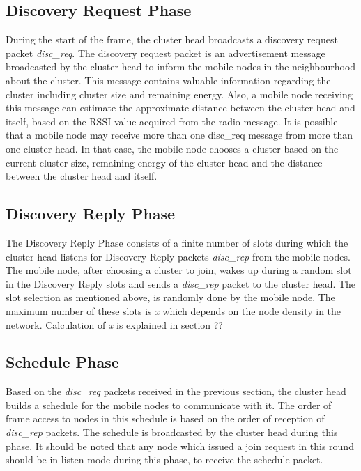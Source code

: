 \documentclass[a4paper, conference, 10pt]{IEEEtran}
\begin{document}
\subsection{Discovery Request Phase}
\label{disc_req_phase}
During the start of the frame, the cluster head broadcasts a discovery request packet \emph{disc\_req}. The discovery request packet is an advertisement message broadcasted by the cluster head to inform the mobile nodes in the neighbourhood about the cluster. This message contains valuable information regarding the cluster including cluster size and remaining energy. Also, a mobile node receiving this message can estimate the approximate distance between the cluster head and itself, based on the RSSI value acquired from the radio message. It is possible that a mobile node may receive more than one disc\_req message from more than one cluster head. In that case, the mobile node chooses a cluster based on the current cluster size, remaining energy of the cluster head and the distance between the cluster head and itself. 

\subsection{Discovery Reply Phase}
\label{disc_rep_phase}
The Discovery Reply Phase consists of a finite number of slots during which the cluster head listens for Discovery Reply packets \emph{disc\_rep} from the mobile nodes. The mobile node, after choosing a cluster to join, wakes up during a random slot in the Discovery Reply slots and sends a \emph{disc\_rep} packet to the cluster head. The slot selection as mentioned above, is randomly done by the mobile node. The maximum number of these slots is \emph{x} which depends on the node density in the network. Calculation of \emph{x} is explained in section ??

\subsection{Schedule Phase}
\label{sched_phase}
Based on the \emph{disc\_req} packets received in the previous section, the cluster head builds a schedule for the mobile nodes to communicate with it. The order of frame access to nodes in this schedule is based on the order of reception of \emph{disc\_rep} packets. The schedule is broadcasted by the cluster head during this phase. It should be noted that any node which issued a join request in this round should be in listen mode during this phase, to receive the schedule packet. 
\end{document}
